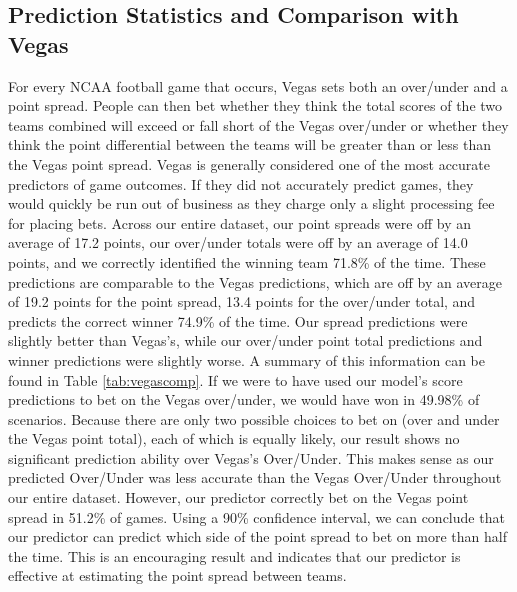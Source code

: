 \documentclass[10pt,twocolumn,letterpaper]{article}
\begin{document}
\subsection{Prediction Statistics and Comparison with Vegas}
For every NCAA football game that occurs, Vegas sets both an over/under and a point spread.  People can then bet whether they think the total scores of the two teams combined will exceed or fall short of the Vegas over/under or whether they think the point differential between the teams will be greater than or less than the Vegas point spread.  Vegas is generally considered one of the most accurate predictors of game outcomes.  If they did not accurately predict games, they would quickly be run out of business as they charge only a slight processing fee for placing bets.  Across our entire dataset, our point spreads were off by an average of 17.2 points, our over/under totals were off by an average of 14.0 points, and we correctly identified the winning team 71.8\% of the time.  These predictions are comparable to the Vegas predictions, which are off by an average of 19.2 points for the point spread, 13.4 points for the over/under total, and predicts the correct winner 74.9\% of the time.  Our spread predictions were slightly better than Vegas's, while our over/under point total predictions and winner predictions were slightly worse.  A summary of this information can be found in Table \ref{tab:vegascomp}.  If we were to have used our model's score predictions to bet on the Vegas over/under, we would have won in 49.98\% of scenarios.  Because there are only two possible choices to bet on (over and under the Vegas point total), each of which is equally likely, our result shows  no significant prediction ability over Vegas's Over/Under.  This makes sense as our predicted Over/Under was less accurate than the Vegas Over/Under throughout our entire dataset.  However, our predictor correctly bet on the Vegas point spread in 51.2\% of games.  Using a 90\% confidence interval, we can conclude that our predictor can predict which side of the point spread to bet on more than half the time.  This is an encouraging result and indicates that our predictor is effective at estimating the point spread between teams.
\end{document}
